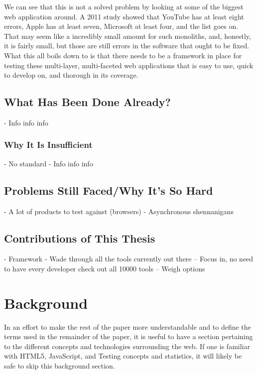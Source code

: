 \documentclass[11pt]{article}
\begin{document}
We can see that this is not a solved problem by looking at some of the biggest web application around. A 2011 study showed that YouTube has at least eight errors, Apple has at least seven, Microsoft at least four, and the list goes on. \cite{ErrorsInTheWild} That may seem like a incredibly small amount for such monoliths, and, honestly, it is fairly small, but those are still errors in the software that ought to be fixed.
What this all boils down to is that there needs to be a framework in place for testing these multi-layer, multi-faceted web applications that is easy to use, quick to develop on, and thorough in its coverage.

\subsection{What Has Been Done Already?}
- Info info info

\subsubsection{Why It Is Insufficient}
- No standard
- Info info info

\subsection{Problems Still Faced/Why It's So Hard}
- A lot of products to test against (browsers)
- Asynchronous shennanigans

\subsection{Contributions of This Thesis}
- Framework
- Wade through all the tools currently out there
-- Focus in, no need to have every developer check out all 10000 tools
-- Weigh options


\section{Background}
In an effort to make the rest of the paper more understandable and to define the terms used in the remainder of the paper, it is useful to have a section pertaining to the different concepts and technologies surrounding the web.
If one is familiar with HTML5, JavaScript, and Testing concepts and statistics, it will likely be safe to skip this background section.
\end{document}
